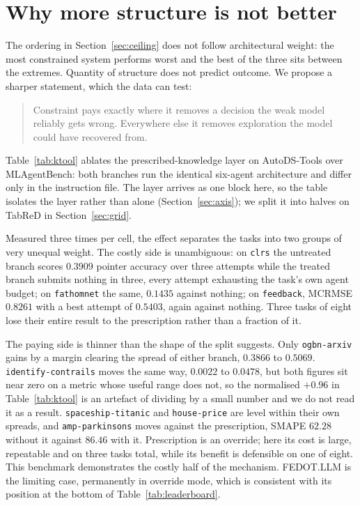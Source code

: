 \section{Why more structure is not better}
\label{sec:mechanism}

The ordering in Section~\ref{sec:ceiling} does not follow architectural weight:
the most constrained system performs worst and the best of the three sits between
the extremes. Quantity of structure does not predict outcome. We propose a
sharper statement, which the data can test:

\begin{quote}
Constraint pays exactly where it removes a decision the weak model reliably
gets wrong. Everywhere else it removes exploration the model could have
recovered from.
\end{quote}

Table~\ref{tab:ktool} ablates the prescribed-knowledge layer on AutoDS-Tools over
MLAgentBench: both branches run the identical six-agent architecture and differ
only in the instruction file. The layer arrives as one block here, so the table
isolates the layer rather than \Ktool{} alone (Section~\ref{sec:axis}); we split
it into halves on TabReD in Section~\ref{sec:grid}.



Measured three times per cell, the effect separates the tasks into two groups of
very unequal weight. The costly side is unambiguous: on \texttt{clrs} the
untreated branch scores $0.3909$ pointer accuracy over three attempts while the
treated branch submits nothing in three, every attempt exhausting the task's own
agent budget; on \texttt{fathomnet} the same, $0.1435$ against nothing; on
\texttt{feedback}, MCRMSE $0.8261$ with a best attempt of $0.5403$, again against
nothing. Three tasks of eight lose their entire result to the prescription rather
than a fraction of it.

The paying side is thinner than the shape of the split suggests. Only
\texttt{ogbn-arxiv} gains by a margin clearing the spread of either branch,
$0.3866$ to $0.5069$. \texttt{identify-contrails} moves the same way, $0.0022$ to
$0.0478$, but both figures sit near zero on a metric whose useful range does not,
so the normalised $+0.96$ in Table~\ref{tab:ktool} is an artefact of dividing by
a small number and we do not read it as a result.
\texttt{spaceship-titanic} and \texttt{house-price} are level within their own
spreads, and \texttt{amp-parkinsons} moves against the prescription, SMAPE
$62.28$ without it against $86.46$ with it. Prescription is an override; here its
cost is large, repeatable and on three tasks total, while its benefit is
defensible on one of eight. This benchmark demonstrates the costly half of the
mechanism. FEDOT.LLM is the limiting case, permanently in override mode, which is
consistent with its position at the bottom of Table~\ref{tab:leaderboard}.

